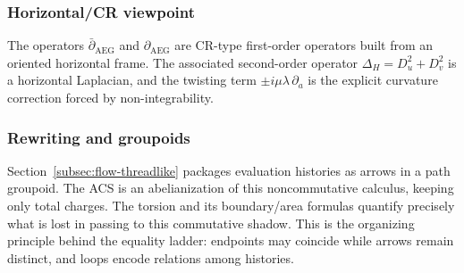 \subsubsection*{Horizontal/CR viewpoint}
The operators $\bar\partial_{\mathrm{AEG}}$ and $\partial_{\mathrm{AEG}}$ are CR-type first-order operators built from an oriented horizontal frame. The associated second-order operator $\Delta_H=D_u^2+D_v^2$ is a horizontal Laplacian, and the twisting term $\pm i\mu\lambda\,\partial_a$ is the explicit curvature correction forced by non-integrability.

\subsubsection*{Rewriting and groupoids}
Section~\ref{subsec:flow-threadlike} packages evaluation histories as arrows in a path groupoid. The ACS is an abelianization of this noncommutative calculus, keeping only total charges. The torsion and its boundary/area formulas quantify precisely what is lost in passing to this commutative shadow. This is the organizing principle behind the equality ladder: endpoints may coincide while arrows remain distinct, and loops encode relations among histories.
